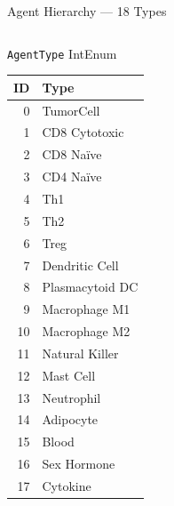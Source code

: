 \documentclass[aspectratio=169,10pt]{beamer}
\begin{document}
\begin{frame}{Agent Hierarchy --- 18 Types}
\begin{columns}[T]
    \begin{block}{\texttt{AgentType} IntEnum}
      \scriptsize
      \begin{tabular}{@{}rl@{}}
        \toprule
        ID & Type \\
        \midrule
        0 & TumorCell \\
        1 & CD8 Cytotoxic \\
        2 & CD8 Na\"ive \\
        3 & CD4 Na\"ive \\
        4 & Th1 \\
        5 & Th2 \\
        6 & Treg \\
        7 & Dendritic Cell \\
        8 & Plasmacytoid DC \\
        9 & Macrophage M1 \\
        10 & Macrophage M2 \\
        11 & Natural Killer \\
        12 & Mast Cell \\
        13 & Neutrophil \\
        14 & Adipocyte \\
        15 & Blood \\
        16 & Sex Hormone \\
        17 & Cytokine \\
        \bottomrule
      \end{tabular}
    \end{block}
  \end{columns}
\end{frame}
\end{document}
